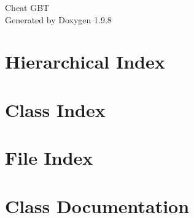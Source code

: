 \documentclass[twoside]{book}
\newcommand{\+}{\discretionary{\mbox{\scriptsize$\hookleftarrow$}}{}{}}
\newcommand{\clearemptydoublepage}{%
    \newpage{\pagestyle{empty}\cleardoublepage}%
  }
\begin{document}
  \raggedbottom
    \hypersetup{pageanchor=false,
                bookmarksnumbered=true,
                pdfencoding=unicode
               }
  \begin{titlepage}
  \vspace*{7cm}
  \begin{center}%
  {\Large Cheat GBT}\\
  \vspace*{1cm}
  {\large Generated by Doxygen 1.9.8}\\
  \end{center}
  \end{titlepage}
  \clearemptydoublepage
  \tableofcontents
  \clearemptydoublepage
  \hypersetup{pageanchor=true}
\chapter{Hierarchical Index}

\chapter{Class Index}

\chapter{File Index}

\chapter{Class Documentation}































































\end{document}
